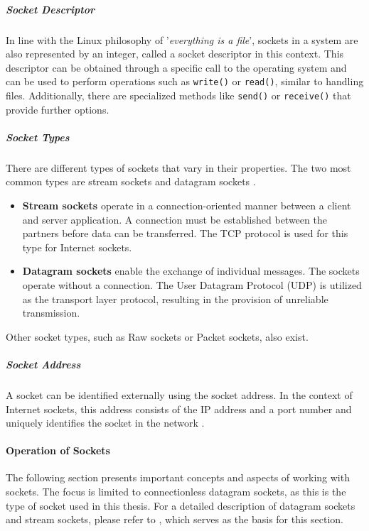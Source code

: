 \subparagraph{Socket Descriptor}
In line with the Linux philosophy of '\textit{everything is a file}', sockets in a system are also represented by an integer, called a socket descriptor in this context. This descriptor can be obtained through a specific call to the operating system and can be used to perform operations such as \texttt{write()} or \texttt{read()}, similar to handling files. Additionally, there are specialized methods like \texttt{send()} or \texttt{receive()} that provide further options.

\subparagraph{Socket Types}
There are different types of sockets that vary in their properties. The two most common types are stream sockets and datagram sockets \cite{like03}.

\begin{itemize}
\item \textbf{Stream sockets} operate in a connection-oriented manner between a client and server application. A connection must be established between the partners before data can be transferred. The TCP protocol is used for this type for Internet sockets.
\item \textbf{Datagram sockets} enable the exchange of individual messages. The sockets operate without a connection. The User Datagram Protocol (UDP) is utilized as the transport layer protocol, resulting in the provision of unreliable transmission.
\end{itemize}

Other socket types, such as Raw sockets or Packet sockets, also exist.


\subparagraph{Socket Address}
A socket can be identified externally using the socket address. In the context of Internet sockets, this address consists of the IP address and a port number and uniquely identifies the socket in the network \cite{sock02}.


\paragraph{Operation of Sockets}

The following section presents important concepts and aspects of working with sockets. The focus is limited to connectionless datagram sockets, as this is the type of socket used in this thesis. For a detailed description of datagram sockets and stream sockets, please refer to \cite{like03}, which serves as the basis for this section.

